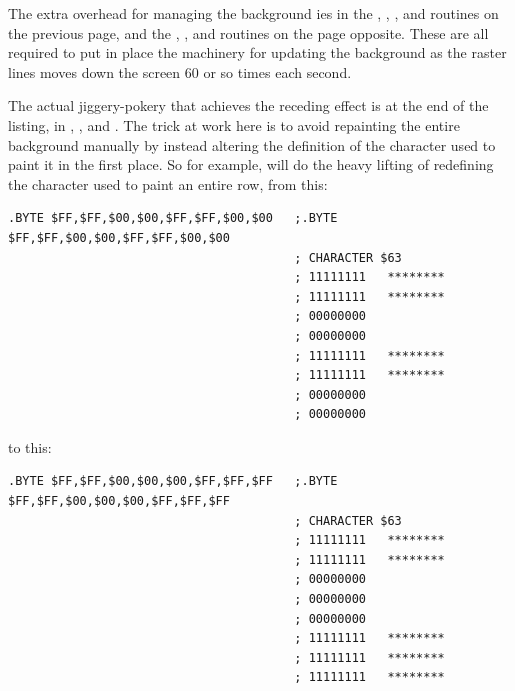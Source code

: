 The extra overhead for managing the background ies in the , , , and
 routines on the previous page, and the , , and
 routines on the page opposite. These are all required to put in place the machinery for updating the background as the raster
lines moves down the screen 60 or so times each second. 

The actual jiggery-pokery that achieves the receding effect is at the end of the listing, in , ,
and . The trick at work here is to avoid repainting the entire background manually by instead altering the definition of the character
used to paint it in the first place. So for example,  will do the heavy lifting of redefining the character used to paint an entire row,
from this:
\begin{lstlisting}[basicstyle=\ttfamily\tiny]
.BYTE $FF,$FF,$00,$00,$FF,$FF,$00,$00   ;.BYTE $FF,$FF,$00,$00,$FF,$FF,$00,$00
                                        ; CHARACTER $63
                                        ; 11111111   ********
                                        ; 11111111   ********
                                        ; 00000000           
                                        ; 00000000           
                                        ; 11111111   ********
                                        ; 11111111   ********
                                        ; 00000000           
                                        ; 00000000           
\end{lstlisting}
to this:
\begin{lstlisting}[basicstyle=\ttfamily\tiny]
.BYTE $FF,$FF,$00,$00,$00,$FF,$FF,$FF   ;.BYTE $FF,$FF,$00,$00,$00,$FF,$FF,$FF
                                        ; CHARACTER $63
                                        ; 11111111   ********
                                        ; 11111111   ********
                                        ; 00000000           
                                        ; 00000000           
                                        ; 00000000           
                                        ; 11111111   ********
                                        ; 11111111   ********
                                        ; 11111111   ********
\end{lstlisting}

